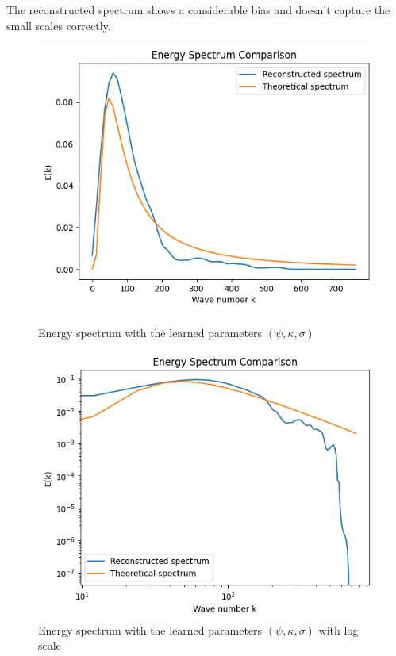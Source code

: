 \documentclass[a4paper,12pt]{article}
\theoremstyle{definition}
\begin{document}
The reconstructed spectrum shows a considerable bias and doesn't capture the small scales correctly.

\begin{figure}[H]
    \centering
    \begin{minipage}{0.49\textwidth}
        \includegraphics[width=\linewidth]{VelIncrPSIKAPPASIGMA/EnergySpectrum.png}
        \caption{Energy spectrum with the learned parameters $(\psi,\kappa,\sigma)$}
        \label{fig:EnergySpectrumPsiKappaSigma}
    \end{minipage} \hfill
        \begin{minipage}{0.49\textwidth}
        \includegraphics[width=\linewidth]{VelIncrPSIKAPPASIGMA/EnergySpectrumLog.png}
        \caption{Energy spectrum with the learned parameters $(\psi,\kappa,\sigma)$ with log scale}
        \label{fig:EnergySpectrumLogPsiKappaSigma}
    \end{minipage}
    \end{figure}
\end{document}
